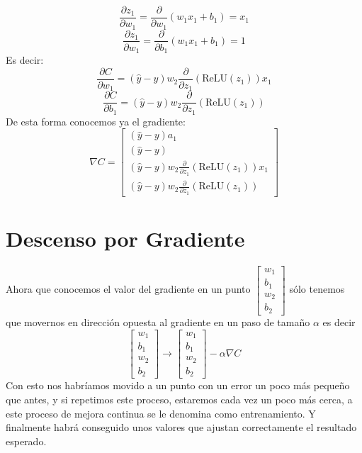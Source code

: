 \documentclass{article}
\begin{document}
	\[
	\frac{\partial z_1}{\partial w_1} = \frac{\partial}{\partial w_1} (w_1x_1 + b_1) = x_1
	\]
	\[
	\frac{\partial z_1}{\partial w_1} = \frac{\partial}{\partial b_1} (w_1x_1 + b_1) = 1
	\]
	Es decir:
	\[
	\frac{\partial C}{\partial w_1} = (\hat{y} - y)w_2\frac{\partial}{\partial z_1}(\text{ReLU}(z_1))x_1
	\]
	\[
	\frac{\partial C}{\partial b_1} = (\hat{y} - y)w_2\frac{\partial}{\partial z_1}(\text{ReLU}(z_1))
	\]
	De esta forma conocemos ya el gradiente:
	\[
	\nabla C = 
	\begin{bmatrix}
		(\hat{y} - y)a_1 \\
		(\hat{y} - y) \\
		(\hat{y} - y)w_2\frac{\partial}{\partial z_1}(\text{ReLU}(z_1))x_1 \\
		(\hat{y} - y)w_2\frac{\partial}{\partial z_1}(\text{ReLU}(z_1))
	\end{bmatrix}
	\]
	
	\section{Descenso por Gradiente}
	Ahora que conocemos el valor del gradiente en un punto \( \begin{bmatrix}
		w_1\\ 
		b_1\\
		w_2\\
		b_2
	\end{bmatrix}\) sólo tenemos que movernos en dirección opuesta al gradiente en un paso de tamaño \(\alpha\) 
	es decir 
	 \[ \begin{bmatrix}
		w_1\\ 
		b_1\\
		w_2\\
		b_2
	\end{bmatrix} 
	\rightarrow
	\begin{bmatrix}
		w_1\\ 
		b_1\\
		w_2\\
		b_2
	\end{bmatrix} - \alpha \nabla C
	\]
	Con esto nos habríamos movido a un punto con un error un poco más pequeño que antes, y si repetimos este proceso, estaremos cada vez un poco más cerca, a este proceso de mejora continua se le denomina como entrenamiento. Y finalmente habrá conseguido unos valores que ajustan correctamente el resultado esperado.
	\newpage
\end{document}
